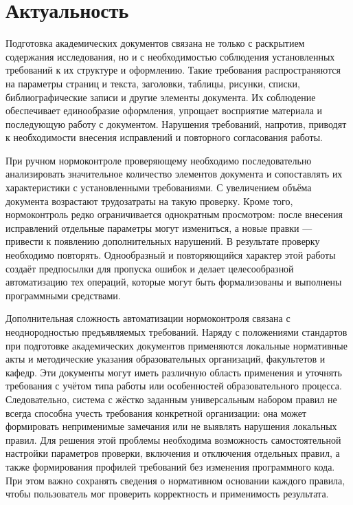 \documentclass[a4paper,14pt]{extarticle}
\begin{document}
\section{Актуальность}
Подготовка академических документов связана не только с раскрытием содержания исследования, но и с необходимостью соблюдения установленных требований к их структуре и оформлению. Такие требования распространяются на параметры страниц и текста, заголовки, таблицы, рисунки, списки, библиографические записи и другие элементы документа. Их соблюдение обеспечивает единообразие оформления, упрощает восприятие материала и последующую работу с документом. Нарушения требований, напротив, приводят к необходимости внесения исправлений и повторного согласования работы.

При ручном нормоконтроле проверяющему необходимо последовательно анализировать значительное количество элементов документа и сопоставлять их характеристики с установленными требованиями. С увеличением объёма документа возрастают трудозатраты на такую проверку. Кроме того, нормоконтроль редко ограничивается однократным просмотром: после внесения исправлений отдельные параметры могут измениться, а новые правки — привести к появлению дополнительных нарушений. В результате проверку необходимо повторять. Однообразный и повторяющийся характер этой работы создаёт предпосылки для пропуска ошибок и делает целесообразной автоматизацию тех операций, которые могут быть формализованы и выполнены программными средствами.

Дополнительная сложность автоматизации нормоконтроля связана с неоднородностью предъявляемых требований. Наряду с положениями стандартов при подготовке академических документов применяются локальные нормативные акты и методические указания образовательных организаций, факультетов и кафедр. Эти документы могут иметь различную область применения и уточнять требования с учётом типа работы или особенностей образовательного процесса. Следовательно, система с жёстко заданным универсальным набором правил не всегда способна учесть требования конкретной организации: она может формировать неприменимые замечания или не выявлять нарушения локальных правил. Для решения этой проблемы необходима возможность самостоятельной настройки параметров проверки, включения и отключения отдельных правил, а также формирования профилей требований без изменения программного кода. При этом важно сохранять сведения о нормативном основании каждого правила, чтобы пользователь мог проверить корректность и применимость результата.
\end{document}
